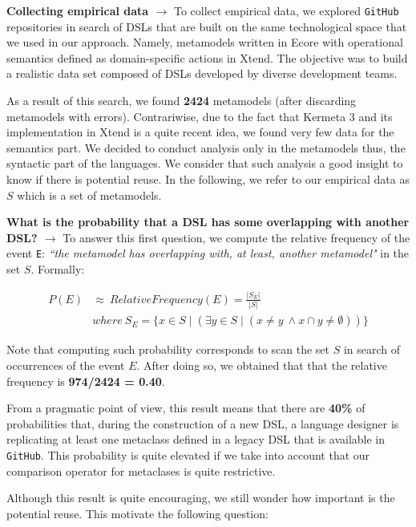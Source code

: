 \textbf{Collecting empirical data $\rightarrow$} To collect empirical data, we explored \texttt{GitHub} repositories in search of DSLs that are built on the same technological space that we used in our approach. Namely, metamodels written in Ecore with operational semantics defined as domain-specific actions in Xtend. The objective was to build a realistic data set composed of DSLs developed by diverse development teams. 

As a result of this search, we found \textbf{2424} metamodels (after discarding metamodels with errors). Contrariwise, due to the fact that Kermeta 3 and its implementation in Xtend is a quite recent idea, we found very few data for the semantics part. We decided to conduct analysis only in the metamodels thus, the syntactic part of the languages. We consider that such analysis a good insight to know if there is potential reuse.  In the following, we refer to our empirical data as $S$ which is a set of metamodels.

\textbf{What is the probability that a DSL has some overlapping with another DSL? $\rightarrow$} To answer this first question, we compute the relative frequency of the event \texttt{E}: \textit{``the metamodel has overlapping with, at least, another metamodel"} in the set $S$. Formally:

\begin{equation}
\begin{split}
P(E) & \approx ~ Relative Frequency (E) = \frac{|S_{E}|}{|S|}\\
& where ~ S_{E} = \{x \in S \mid (\exists y \in S \mid (x \neq y ~ \wedge x \cap y \neq \emptyset )) \}
\end{split}
\end{equation}

Note that computing such probability corresponds to scan the set $S$ in search of occurrences of the event $E$. After doing so, we obtained that that the relative frequency is \textbf{974/2424 = 0.40}.

From a pragmatic point of view, this result means that there are \textbf{40\%} of probabilities that, during the construction of a new DSL, a language designer is replicating at least one metaclass defined in a legacy DSL that is available in \texttt{GitHub}. This probability is quite elevated if we take into account that our comparison operator for metaclases is quite restrictive.

Although this result is quite encouraging, we still wonder how important is the potential reuse. This motivate the following question:

